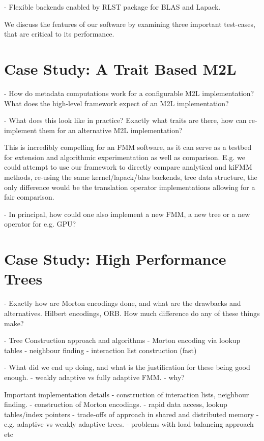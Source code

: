- Flexible backends enabled by RLST package for BLAS and Lapack.

We discuss the features of our software by examining three important test-cases, that are critical to its performance.

\section{Case Study: A Trait Based M2L}

- How do metadata computations work for a configurable M2L implementation? What does the high-level framework expect of an M2L implementation?

- What does this look like in practice? Exactly what traits are there, how can re-implement them for an alternative M2L implementation?

This is incredibly compelling for an FMM software, as it can serve as a testbed for extension and algorithmic experimentation as well as comparison. E.g. we could attempt to use our framework to directly compare analytical and kiFMM methods, re-using the same kernel/lapack/blas backends, tree data structure, the only difference would be the translation operator implementations allowing for a fair comparison.

- In principal, how could one also implement a new FMM, a new tree or a new operator for e.g. GPU?

\section{Case Study: High Performance Trees}

- Exactly how are Morton encodings done, and what are the drawbacks and alternatives. Hilbert encodings, ORB. How much difference do any of these things make?

- Tree Construction approach and algorithms
    - Morton encoding via lookup tables
    - neighbour finding
    - interaction list construction (fast)

- What did we end up doing, and what is the justification for these being good enough.
    - weakly adaptive vs fully adaptive FMM.
    - why?

Important implementation details
    - construction of interaction lists, neighbour finding.
    - construction of Morton encodings.
    - rapid data access, lookup tables/index pointers
    - trade-offs of approach in shared and distributed memory
        - e.g. adaptive vs weakly adaptive trees.
        - problems with load balancing approach etc

